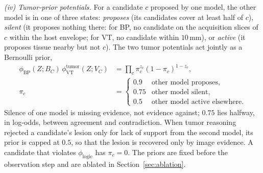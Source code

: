 \documentclass[fleqn,10pt]{olplainarticle}
\begin{document}
\textit{(iv) Tumor-prior potentials.} For a candidate $c$ proposed by one model, the other model is in one of three
states: \emph{proposes} (its candidates cover at least half of $c$), \emph{silent} (it proposes nothing there: for BP, no
candidate on the acquisition slices of $c$ within the host envelope; for VT, no candidate within $10$\,mm), or
\emph{active} (it proposes tissue nearby but not $c$). The two tumor potentials act jointly as a Bernoulli prior,
\begin{equation}
\label{eq:tumor_prior}
\begin{split}
\phi_{\mathrm{BP}}(Z;B_C)\,\phi^{\mathrm{tumor}}_{\mathrm{VT}}(Z;V_C)&=\prod_{c}\pi_c^{z_c}(1-\pi_c)^{1-z_c},\\
\pi_c&=\begin{cases}
0.9 & \text{other model proposes},\\
0.75 & \text{other model silent},\\
0.5 & \text{other model active elsewhere}.
\end{cases}
\end{split}
\end{equation}
Silence of one model is missing evidence, not evidence against; $0.75$ lies halfway, in log-odds, between agreement and
contradiction. When tumor reasoning rejected a candidate's lesion only for lack of support from the second model, its prior
is capped at $0.5$, so that the lesion is recovered only by image evidence. A candidate that violates
$\phi_{\mathrm{logic}}$ has $\pi_c=0$. The priors are fixed before the observation step and are ablated in Section~\ref{sec:ablation}.

\end{document}
